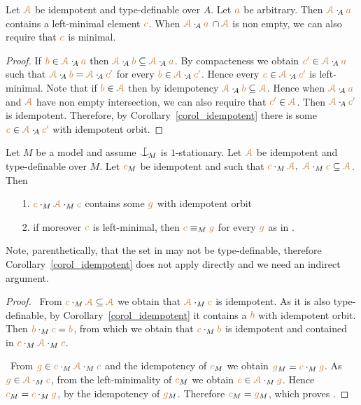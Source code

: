 \documentclass[creche.tex]{subfiles}
\begin{document}
\begin{proposition}\label{prop_minimal_existence1}
Let $\mrA$ be idempotent and type-definable over $A$.
Let ${\mr a}$ be arbitrary.
Then $\mrA\cdot_{\!A}{\mr a}$ contains a left-minimal element ${\mr c}$.
When $\mrA\cdot_{\!A}{\mr a}\,\cap\mrA$ is non empty, we can also require that ${\mr c}$ is minimal.
\end{proposition}
\begin{proof}
If ${\mr b}\in\mrA\cdot_{\!A}{\mr a}$ then $\mrA\cdot_{\!A}{\mr b}\subseteq\mrA\cdot_{\!A}{\mr a}$.
By compacteness we obtain ${\mr c'}\in\mrA\cdot_{\!A}{\mr a}$ such that $\mrA\cdot_{\!A}{\mr b}=\mrA\cdot_{\!A}{\mr c'}$ for every ${\mr b}\in\mrA\cdot_{\!A}{\mr c'}$.
Hence every ${\mr c}\in\mrA\cdot_{\!A}{\mr c'}$ is left-minimal.
Note that if ${\mr b}\in\mrA$ then by idempotency  $\mrA\cdot_{\!A}{\mr b}\subseteq\mrA$. Hence when $\mrA\cdot_{\!A}{\mr a}$ and $\mrA$ have non empty intersection, we can also require that ${\mr c'}\in\mrA$. 
Then $\mrA\cdot_{\!A}{\mr c'}$ is idempotent. 
Therefore, by Corollary~\ref{corol_idempotent} there is some ${\mr c}\in\mrA\cdot_{\!A}{\mr c'}$ with idempotent orbit.
\end{proof}

\begin{proposition}\label{prop_minimal_existence2}
Let $M$ be a model and assume $\nonforkc_{\!M}$ is $1$-stationary.
Let $\mrA$ be idempotent and type-definable over $M$.
Let ${\mr c}_M$ be idempotent and such that 
${\mr c}\cdot_M\mrA,\ \mrA\cdot_M{\mr c}\subseteq\mrA$.
Then
\begin{itemize}
\item[1.]  ${\mr c}\cdot_M\mrA\cdot_M{\mr c}$ contains some ${\mr g}$ with idempotent orbit 
\item[2.] if moreover ${\mr c}$ is left-minimal, then ${\mr c}\equiv_M{\mr g}$ for every ${\mr g}$ as in .
\end{itemize} 
\end{proposition}

Note, parenthetically, that the set in  may not be type-definable, 
therefore Corollary~\ref{corol_idempotent} does not apply 
directly and we need an indirect argument.

\begin{proof} \  
From ${\mr c}\cdot_M\mrA\subseteq\mrA$ we obtain that $\mrA\cdot_M{\mr c}$ is idempotent.
As it is  also type-definable, 
by Corollary~\ref{corol_idempotent} it contains a ${\mr b}$ with idempotent orbit.
Then ${\mr b}\cdot_M{\mr c}={\mr b}$, from which we obtain that ${\mr c}\cdot_M{\mr b}$ is idempotent and contained in ${\mr c}\cdot_M\mrA\cdot_M{\mr c}$.

 \ From ${\mr g}\in{\mr c}\cdot_M\mrA\cdot_M{\mr c}$ and the idempotency of ${\mr c}_M$ 
we obtain ${\mr g}_M={\mr c}\cdot_M{\mr g}$.
As ${\mr g}\in\mrA\cdot_M{\mr c}$, from the left-minimality of ${\mr c}_M$ we obtain ${\mr c}\in\mrA\cdot_M{\mr g}$.
Hence ${\mr c}_M={\mr c}\cdot_M{\mr g}$, by the idempotency of ${\mr g}_M$.
Therefore ${\mr c}_M={\mr g}_M$, which proves \ssf{2}.
\end{proof}
\end{document}
